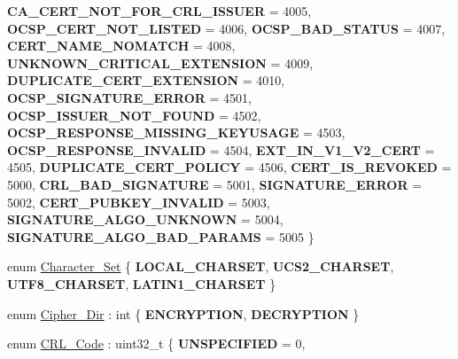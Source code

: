 \begin{DoxyCompactItemize}
\newline
{\bfseries C\+A\+\_\+\+C\+E\+R\+T\+\_\+\+N\+O\+T\+\_\+\+F\+O\+R\+\_\+\+C\+R\+L\+\_\+\+I\+S\+S\+U\+ER} = 4005, 
{\bfseries O\+C\+S\+P\+\_\+\+C\+E\+R\+T\+\_\+\+N\+O\+T\+\_\+\+L\+I\+S\+T\+ED} = 4006, 
{\bfseries O\+C\+S\+P\+\_\+\+B\+A\+D\+\_\+\+S\+T\+A\+T\+US} = 4007, 
{\bfseries C\+E\+R\+T\+\_\+\+N\+A\+M\+E\+\_\+\+N\+O\+M\+A\+T\+CH} = 4008, 
\newline
{\bfseries U\+N\+K\+N\+O\+W\+N\+\_\+\+C\+R\+I\+T\+I\+C\+A\+L\+\_\+\+E\+X\+T\+E\+N\+S\+I\+ON} = 4009, 
{\bfseries D\+U\+P\+L\+I\+C\+A\+T\+E\+\_\+\+C\+E\+R\+T\+\_\+\+E\+X\+T\+E\+N\+S\+I\+ON} = 4010, 
{\bfseries O\+C\+S\+P\+\_\+\+S\+I\+G\+N\+A\+T\+U\+R\+E\+\_\+\+E\+R\+R\+OR} = 4501, 
{\bfseries O\+C\+S\+P\+\_\+\+I\+S\+S\+U\+E\+R\+\_\+\+N\+O\+T\+\_\+\+F\+O\+U\+ND} = 4502, 
\newline
{\bfseries O\+C\+S\+P\+\_\+\+R\+E\+S\+P\+O\+N\+S\+E\+\_\+\+M\+I\+S\+S\+I\+N\+G\+\_\+\+K\+E\+Y\+U\+S\+A\+GE} = 4503, 
{\bfseries O\+C\+S\+P\+\_\+\+R\+E\+S\+P\+O\+N\+S\+E\+\_\+\+I\+N\+V\+A\+L\+ID} = 4504, 
{\bfseries E\+X\+T\+\_\+\+I\+N\+\_\+\+V1\+\_\+\+V2\+\_\+\+C\+E\+RT} = 4505, 
{\bfseries D\+U\+P\+L\+I\+C\+A\+T\+E\+\_\+\+C\+E\+R\+T\+\_\+\+P\+O\+L\+I\+CY} = 4506, 
\newline
{\bfseries C\+E\+R\+T\+\_\+\+I\+S\+\_\+\+R\+E\+V\+O\+K\+ED} = 5000, 
{\bfseries C\+R\+L\+\_\+\+B\+A\+D\+\_\+\+S\+I\+G\+N\+A\+T\+U\+RE} = 5001, 
{\bfseries S\+I\+G\+N\+A\+T\+U\+R\+E\+\_\+\+E\+R\+R\+OR} = 5002, 
{\bfseries C\+E\+R\+T\+\_\+\+P\+U\+B\+K\+E\+Y\+\_\+\+I\+N\+V\+A\+L\+ID} = 5003, 
\newline
{\bfseries S\+I\+G\+N\+A\+T\+U\+R\+E\+\_\+\+A\+L\+G\+O\+\_\+\+U\+N\+K\+N\+O\+WN} = 5004, 
{\bfseries S\+I\+G\+N\+A\+T\+U\+R\+E\+\_\+\+A\+L\+G\+O\+\_\+\+B\+A\+D\+\_\+\+P\+A\+R\+A\+MS} = 5005
 \}
\item 
enum \hyperlink{namespace_botan_a416eb1af7496d74b885a20ff833e9b33}{Character\+\_\+\+Set} \{ {\bfseries L\+O\+C\+A\+L\+\_\+\+C\+H\+A\+R\+S\+ET}, 
{\bfseries U\+C\+S2\+\_\+\+C\+H\+A\+R\+S\+ET}, 
{\bfseries U\+T\+F8\+\_\+\+C\+H\+A\+R\+S\+ET}, 
{\bfseries L\+A\+T\+I\+N1\+\_\+\+C\+H\+A\+R\+S\+ET}
 \}
\item 
enum \hyperlink{namespace_botan_a8d9547a8fb3e868810b169b20ac389ee}{Cipher\+\_\+\+Dir} \+: int \{ {\bfseries E\+N\+C\+R\+Y\+P\+T\+I\+ON}, 
{\bfseries D\+E\+C\+R\+Y\+P\+T\+I\+ON}
 \}
\item 
enum \hyperlink{namespace_botan_a557e654e0c387a4ef2521e3ece516ca7}{C\+R\+L\+\_\+\+Code} \+: uint32\+\_\+t \{ \newline
{\bfseries U\+N\+S\+P\+E\+C\+I\+F\+I\+ED} = 0, 

\end{DoxyCompactItemize}
